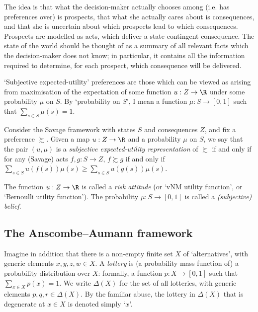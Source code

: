 The idea is that what the decision-maker actually chooses among (i.e. has preferences over) is prospects, that what she actually cares about is consequences, and that she is uncertain about which prospects lead to which consequences. Prospects are modelled as acts, which deliver a state-contingent consequence. The state of the world should be thought of as a summary of all relevant facts which the decision-maker does not know; in particular, it contains all the information required to determine, for each prospect, which consequence will be delivered.

`Subjective expected-utility' preferences are those which can be viewed as arising from maximisation of the expectation of some function $u : Z \to \R$ under some probability $\mu$ on $S$. By `probability on $S$', I mean a function $\mu : S \to [0,1]$ such that $\sum_{s \in S} \mu(s) = 1$.

\begin{definition}
	\label{definition:seu_savage}
	Consider the Savage framework with states $S$ and consequences $Z$, and fix a preference $\succsim$. Given a map $u : Z \to \R$ and a probability $\mu$ on $S$, we say that the pair $(u,\mu)$ is a \emph{subjective expected-utility representation} of $\succsim$ if and only if for any (Savage) acts $f,g : S \to Z$, $f \succsim g$ if and only if $\sum_{s \in S} u(f(s)) \mu(s) \geq \sum_{s \in S} u(g(s)) \mu(s)$.
\end{definition}

The function $u : Z \to \R$ is called a \emph{risk attitude} (or `vNM utility function', or `Bernoulli utility function'). The probability $\mu : S \to [0,1]$ is called a \emph{(subjective) belief}.



\subsection{The Anscombe--Aumann framework}
\label{sec:acts:aa}

Imagine in addition that there is a non-empty finite set $X$ of `alternatives', with generic elements $x,y,z,w \in X$. A \emph{lottery} is (a probability mass function of) a probability distribution over $X$: formally, a function $p : X \to [0,1]$ such that $\sum_{x \in X} p(x) = 1$. We write $\Delta(X)$ for the set of all lotteries, with generic elements $p,q,r \in \Delta(X)$. By the familiar abuse, the lottery in $\Delta(X)$ that is degenerate at $x \in X$ is denoted simply `$x$'.

